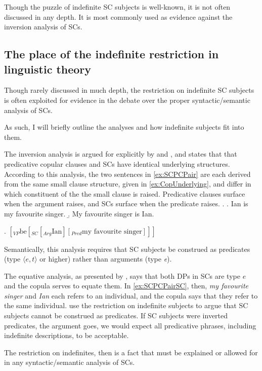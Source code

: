 \documentclass[GPFinal]{subfiles}
\begin{document}
Though the puzzle of indefinite SC subjects is well-known, it is not often discussed in any depth.
It is most commonly used as evidence against the inversion analysis of SCs.
\subsection{The place of the indefinite restriction in linguistic theory}
Though rarely discussed in much depth, the restriction on indefinite SC subjects is often exploited for evidence in the debate over the proper syntactic/semantic analysis of SCs.

As such, I will briefly outline the analyses and how indefinite subjects fit into them.

The inversion analysis is argued for explicitly by \textcite{mikkelsen2004specifying} and \textcite{moro1997raising}, and states that that predicative copular clauses and SCs have identical underlying structures.
According to this analysis, the two sentences in \ref{ex:SCPCPair} are each derived from the same small clause structure, given in \ref{ex:CopUnderlying}, and differ in which constituent of the the small clause is raised.
Predicative clauses surface when the argument raises, and SCs surface when the predicate raises.
\ex.\label{ex:SCPCPair}
\a.\label{ex:SCPCPairPC} Ian is my favourite singer.
\b.\label{ex:SCPCPairSC} My favourite singer is Ian.

\ex.\label{ex:CopUnderlying} $[_{VP} \text{be} [_{SC} [_{Arg} \text{Ian}] [_{Pred} \text{my favourite singer}]]]$

Semantically, this analysis requires that SC subjects be construed as predicates (type $\langle e,t\rangle$ or higher) rather than arguments (type \textit{e}).

The equative analysis, as presented by \textcite{heycockkroch1999pseudocleft}, says that both DPs in SCs are type $e$ and the copula serves to equate them.
In \ref{ex:SCPCPairSC}, then, \textit{my favourite singer} and \textit{Ian} each refers to an individual, and the copula says that they refer to the same individual.
\textcite{heycockkroch1999pseudocleft} use the restriction on indefinite subjects to argue that SC subjects cannot be construed as predicates.
If SC subjects were inverted predicates, the argument goes, we would expect all predicative phrases, including indefinite descriptions, to be acceptable.

The restriction on indefinites, then is a fact that must be explained or allowed for in any syntactic/semantic analysis of SCs.
\end{document}
